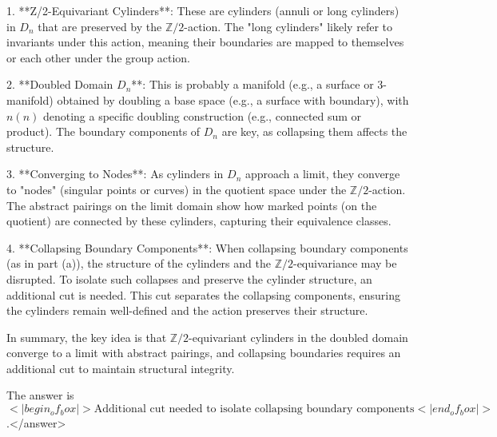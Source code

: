 1. **Z/2-Equivariant Cylinders**: These are cylinders (annuli or long cylinders) in \( D_n \) that are preserved by the \( \mathbb{Z}/2 \)-action. The "long cylinders" likely refer to invariants under this action, meaning their boundaries are mapped to themselves or each other under the group action.  

2. **Doubled Domain \( D_n \)**: This is probably a manifold (e.g., a surface or 3-manifold) obtained by doubling a base space (e.g., a surface with boundary), with \( n(n) \) denoting a specific doubling construction (e.g., connected sum or product). The boundary components of \( D_n \) are key, as collapsing them affects the structure.  

3. **Converging to Nodes**: As cylinders in \( D_n \) approach a limit, they converge to "nodes" (singular points or curves) in the quotient space under the \( \mathbb{Z}/2 \)-action. The abstract pairings on the limit domain show how marked points (on the quotient) are connected by these cylinders, capturing their equivalence classes.  

4. **Collapsing Boundary Components**: When collapsing boundary components (as in part (a)), the structure of the cylinders and the \( \mathbb{Z}/2 \)-equivariance may be disrupted. To isolate such collapses and preserve the cylinder structure, an additional cut is needed. This cut separates the collapsing components, ensuring the cylinders remain well-defined and the action preserves their structure.  

In summary, the key idea is that \( \mathbb{Z}/2 \)-equivariant cylinders in the doubled domain converge to a limit with abstract pairings, and collapsing boundaries requires an additional cut to maintain structural integrity.  

The answer is \(<|begin_of_box|>\text{Additional cut needed to isolate collapsing boundary components}<|end_of_box|>\).</answer>
